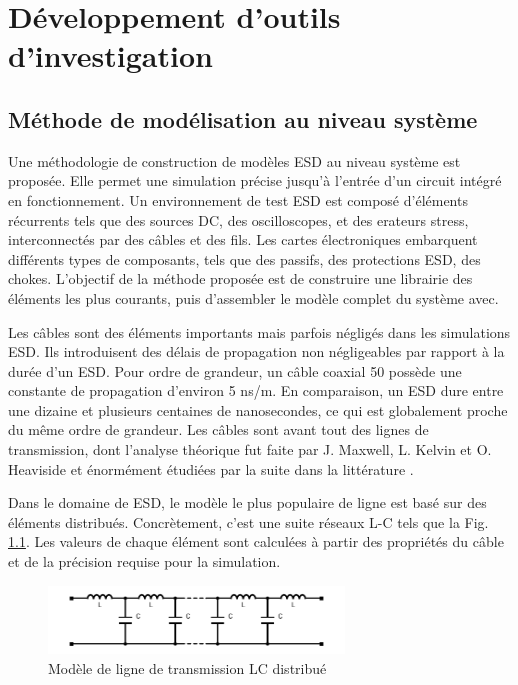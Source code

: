 \chapter{Développement d'outils d'investigation}
\label{chap:2}
\section{Méthode de modélisation au niveau système}

Une méthodologie de construction de modèles ESD au niveau système est proposée.
Elle permet une simulation précise jusqu'à l'entrée d'un circuit intégré en fonctionnement.
Un environnement de test ESD est composé d'éléments récurrents tels que des sources DC, des oscilloscopes, et des erateurs stress, interconnectés par des câbles et des fils.
Les cartes électroniques embarquent différents types de composants, tels que des passifs, des protections ESD, des chokes.
L'objectif de la méthode proposée est de construire une librairie des éléments les plus courants, puis d'assembler le modèle complet du système avec.

Les câbles sont des éléments importants mais parfois négligés dans les simulations ESD.
Ils introduisent des délais de propagation non négligeables par rapport à la durée d'un ESD.
Pour ordre de grandeur, un câble coaxial 50\textOmega{} possède une constante de propagation d'environ 5 ns/m.
En comparaison, un ESD dure entre une dizaine et plusieurs centaines de nanosecondes, ce qui est globalement proche du même ordre de grandeur.
Les câbles sont avant tout des lignes de transmission, dont l'analyse théorique fut faite par J. Maxwell, L. Kelvin et O. Heaviside et énormément étudiées par la suite dans la littérature \cite{branin-tl-ref, hf-coax,lossy-tl,emc-analysis-tl}.

Dans le domaine de ESD, le modèle le plus populaire de ligne est basé sur des éléments distribués.
Concrètement, c'est une suite réseaux L-C tels que la Fig. \ref{fig:dis-line-model}.
Les valeurs de chaque élément sont calculées à partir des propriétés du câble et de la précision requise pour la simulation.

\begin{figure}[!h]
  \centering
  \includegraphics[width=0.7\textwidth]{src/1/figures/lc_ladder.pdf}
  \caption{Modèle de ligne de transmission LC distribué}
  \label{fig:dis-line-model}
\end{figure}

